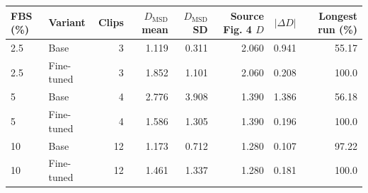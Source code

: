 \begin{tabular}{llrrrrrr}
\toprule
FBS (\%) & Variant & Clips & $D_{\mathrm{MSD}}$ mean & $D_{\mathrm{MSD}}$ SD & Source Fig. 4 $D$ & $|\Delta D|$ & Longest run (\%) \\
\midrule
2.5 & Base & 3 & 1.119 & 0.311 & 2.060 & 0.941 & 55.17 \\
2.5 & Fine-tuned & 3 & 1.852 & 1.101 & 2.060 & 0.208 & 100.0 \\
5 & Base & 4 & 2.776 & 3.908 & 1.390 & 1.386 & 56.18 \\
5 & Fine-tuned & 4 & 1.586 & 1.305 & 1.390 & 0.196 & 100.0 \\
10 & Base & 12 & 1.173 & 0.712 & 1.280 & 0.107 & 97.22 \\
10 & Fine-tuned & 12 & 1.461 & 1.337 & 1.280 & 0.181 & 100.0 \\
\bottomrule
\end{tabular}
